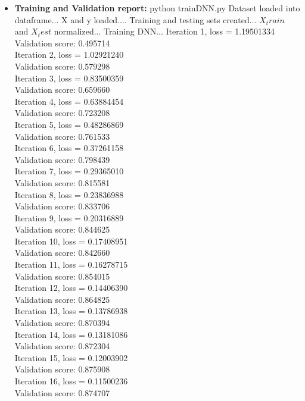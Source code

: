 \documentclass[oneside,a4paper,12pt]{report}
\begin{document}
\begin{normalsize}
\begin{itemize}
		 
		\item \textbf{Training and Validation report: }
		python trainDNN.py
		Dataset loaded into dataframe...
		X and y loaded....
		Training and testing sets created...
		\(X_train\) and \(X_test\) normalized...
		Training DNN...
		Iteration 1, loss = 1.19501334 \\
		Validation score: 0.495714\\
		Iteration 2, loss = 1.02921240\\
		Validation score: 0.579298\\
		Iteration 3, loss = 0.83500359\\
		Validation score: 0.659660\\
		Iteration 4, loss = 0.63884454\\
		Validation score: 0.723208\\
		Iteration 5, loss = 0.48286869\\
		Validation score: 0.761533\\
		Iteration 6, loss = 0.37261158\\
		Validation score: 0.798439\\
		Iteration 7, loss = 0.29365010\\
		Validation score: 0.815581\\
		Iteration 8, loss = 0.23836988\\
		Validation score: 0.833706\\
		Iteration 9, loss = 0.20316889\\
		Validation score: 0.844625\\
		Iteration 10, loss = 0.17408951\\
		Validation score: 0.842660\\
		Iteration 11, loss = 0.16278715\\
		Validation score: 0.854015\\
		Iteration 12, loss = 0.14406390\\
		Validation score: 0.864825\\
		Iteration 13, loss = 0.13786938\\
		Validation score: 0.870394\\
		Iteration 14, loss = 0.13181086\\
		Validation score: 0.872304\\
		Iteration 15, loss = 0.12003902\\
		Validation score: 0.875908\\
		Iteration 16, loss = 0.11500236\\
		Validation score: 0.874707\\

\end{itemize}
\end{normalsize}
\end{document}
